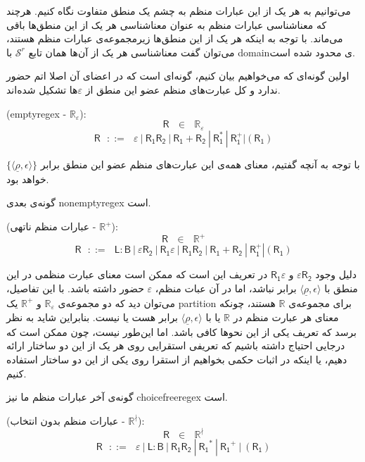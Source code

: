 می‌توانیم به هر یک از این عبارات منظم به چشم یک منطق متفاوت نگاه کنیم. هرچند که معناشناسی عبارات منظم به عنوان معناشناسی هر یک از این منطق‌ها باقی می‌ماند. با توجه به اینکه هر یک از این منطق‌ها زیرمجموعه‌ی عبارات منظم هستند، می‌توان گفت معناشناسی هر یک از آن‌ها همان تابع $\mathcal{S}^r$ با \gls*{domain}ی محدود شده است.

اولین گونه‌ای که می‌خواهیم بیان کنیم، گونه‌ای است که در اعضای آن اصلا اتم حضور ندارد و کل عبارت‌های منظم عضو این منطق از $\varepsilon$ها تشکیل شده‌اند.
\begin{defn}
	(\gls{emptyregex} - $\mathbb{R_\varepsilon}$): 
	$$\mathsf{R} \:\:\:\in\:\:\: \mathbb{R}_\varepsilon$$
	$$\mathsf{R}\:\:\: ::= \:\:\: \varepsilon \: | \: \mathsf{R_1 R_2} \: | 
	\: \mathsf{R_1 + R_2} \: | \: \mathsf{R_1^*} \: | \: \mathsf{R_1^+} | (\mathsf{R_1})$$
\end{defn}


 با توجه به آنچه گفتیم، معنای همه‌ی این عبارت‌های منظم عضو این منطق برابر 
$\{\langle \underline{\rho} , \epsilon \rangle\}$
خواهد بود.

گونه‌ی بعدی \gls{nonemptyregex} است.
\begin{defn}
	(عبارات منظم ناتهی - $\mathbb{R}^+$):
	$$\mathsf{R} \:\:\:\in\:\:\: \mathbb{R}^+$$
	$$\mathsf{R}\:\:\: ::= \:\:\: \mathsf{L:B} \: |
	\: \mathsf{\varepsilon R_2} \: | \: \mathsf{R_1 \varepsilon} \: |
	\: \mathsf{R_1 R_2} \: | 
	\: \mathsf{R_1 + R_2} \: | \: \mathsf{R_1^+} | (\mathsf{R_1})$$
\end{defn}
دلیل وجود 
$\mathsf{\varepsilon R_2}$
و 
$\mathsf{R_1 \varepsilon}$
در تعریف این است که ممکن است معنای عبارت منظمی در این منطق با ${\langle \underline{\rho} , \epsilon \rangle}$ برابر نباشد، اما در آن عبات منظم، $\varepsilon$ حضور داشته باشد. با این تفاصیل، می‌توان دید که دو مجموعه‌ی 
$\mathbb{R}_\varepsilon$
و
$\mathbb{R}^+$
یک \gls*{partition} برای مجموعه‌ی $\mathbb{R}$ هستند، چونکه معنای هر عبارت منظم در $\mathbb{R}$ یا با ${\langle \underline{\rho} , \epsilon \rangle}$ برابر هست یا نیست. بنابراین شاید به نظر برسد که تعریف یکی از این نحوها کافی باشد. اما این‌طور نیست، چون ممکن است که درجایی احتیاج داشته باشیم که تعریفی استقرایی روی هر یک از این دو ساختار ارائه دهیم، یا اینکه در اثبات حکمی بخواهیم از استقرا روی یکی از این دو ساختار استفاده کنیم.

گونه‌ی آخر عبارات منظم ما نیز \gls{choicefreeregex} است.
\begin{defn}
(عبارات منظم بدون انتخاب - $\mathbb{R}^\nmid$):
$$
\mathsf{R}\:\:\: \in \:\:\: \mathbb{R}^\nmid$$
$$
\mathsf{R}\:\:\: ::= \:\:\: \varepsilon \: | \: \mathsf{L:B} \: | \:
\mathsf{R_1 R_2} \: | \: \mathsf{R_1}^* \: | \: \mathsf{R_1}^+ \: | \:
(\mathsf{R_1})$$
\end{defn}

